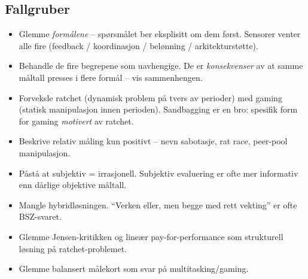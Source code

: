 \subsection*{Fallgruber}
\begin{itemize}\setlength{\itemsep}{2pt}
\item Glemme \emph{formålene} -- spørsmålet ber eksplisitt om dem først. Sensorer venter alle fire (feedback / koordinasjon / belønning / arkitekturstøtte).
\item Behandle de fire begrepene som uavhengige. De er \emph{konsekvenser} av at samme måltall presses i flere formål -- vis sammenhengen.
\item Forveksle ratchet (dynamisk problem på tvers av perioder) med gaming (statisk manipulasjon innen perioden). Sandbagging er en bro: spesifik form for gaming \emph{motivert} av ratchet.
\item Beskrive relativ måling kun positivt -- nevn sabotasje, rat race, peer-pool manipulasjon.
\item Påstå at subjektiv = irrasjonell. Subjektiv evaluering er ofte mer informativ enn dårlige objektive måltall.
\item Mangle hybridløsningen. ``Verken eller, men begge med rett vekting'' er ofte BSZ-svaret.
\item Glemme Jensen-kritikken og lineær pay-for-performance som strukturell løsning på ratchet-problemet.
\item Glemme balansert målekort som svar på multitasking/gaming.
\end{itemize}

\FloatBarrier
